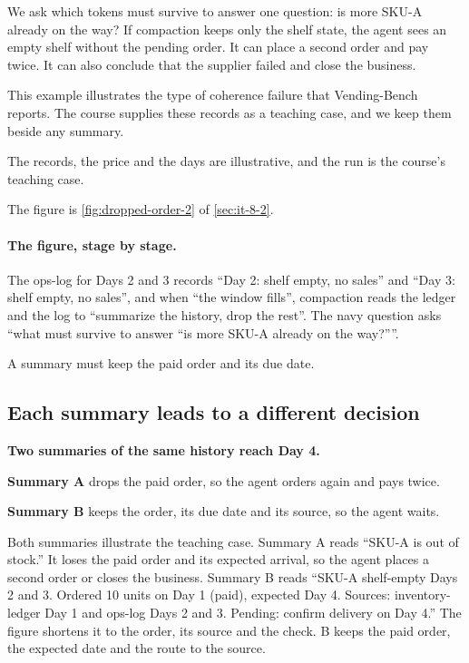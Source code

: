 We ask which tokens must survive to answer one question: is more SKU-A already on the way? If compaction keeps only the shelf state, the agent sees an empty shelf without the pending order. It can place a second order and pay twice. It can also conclude that the supplier failed and close the business.

This example illustrates the type of coherence failure that Vending-Bench reports. The course supplies these records as a teaching case, and we keep them beside any summary.

The records, the price and the days are illustrative, and the run is the course's teaching case.

The figure is \cref{fig:dropped-order-2} of \cref{sec:it-8-2}.

\paragraph{The figure, stage by stage.}
\be
\item The ops-log for Days 2 and 3 records ``Day 2: shelf empty, no sales'' and ``Day 3: shelf empty, no sales'', and when ``the window fills'', compaction reads the ledger and the log to ``summarize the history, drop the rest''. The navy question asks ``what must survive to answer ``is more SKU-A already on the way?''''.
\ee

\begin{takeaway}A summary must keep the paid order and its due date.\end{takeaway}

\subsection{Each summary leads to a different decision}
\label{sec:it-9-3}

\textbf{Two summaries of the same history reach Day 4.}

\bi
\item \textbf{Summary A} drops the paid order, so the agent orders again and pays twice.
\item \textbf{Summary B} keeps the order, its due date and its source, so the agent waits.
\ei

Both summaries illustrate the teaching case. Summary A reads ``SKU-A is out of stock.'' It loses the paid order and its expected arrival, so the agent places a second order or closes the business. Summary B reads ``SKU-A shelf-empty Days 2 and 3. Ordered 10 units on Day 1 (paid), expected Day 4. Sources: inventory-ledger Day 1 and ops-log Days 2 and 3. Pending: confirm delivery on Day 4.'' The figure shortens it to the order, its source and the check. B keeps the paid order, the expected date and the route to the source.

